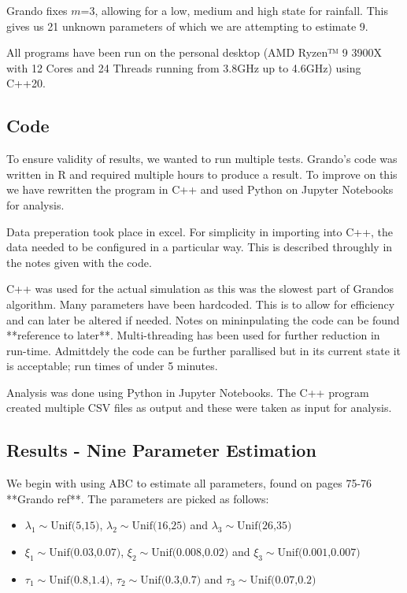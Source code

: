 Grando fixes $m$=3, allowing for a low, medium and high state for rainfall. This gives us 21 unknown parameters of which we are attempting to estimate 9.

All programs have been run on the personal desktop (AMD Ryzen™ 9 3900X with 12 Cores and 24 Threads running from 3.8GHz up to 4.6GHz) using C++20.

\subsection{Code}

To ensure validity of results, we wanted to run multiple tests. Grando's code was written in R and required multiple hours to produce a result. To improve on this we have rewritten the program in C++ and used Python on Jupyter Notebooks for analysis.

Data preperation took place in excel. For simplicity in importing into C++, the data needed to be configured in a particular way. This is described throughly in the notes given with the code. 

C++ was used for the actual simulation as this was the slowest part of Grandos algorithm. Many parameters have been hardcoded. This is to allow for efficiency and can later be altered if needed. Notes on mininpulating the code can be found **reference to later**. Multi-threading has been used for further reduction in run-time. Admittdely the code can be further parallised but in its current state it is acceptable; run times of under 5 minutes. 

Analysis was done using Python in Jupyter Notebooks. The C++ program created multiple CSV files as output and these were taken as input for analysis. 

\subsection{Results - Nine Parameter Estimation}

We begin with using ABC to estimate all parameters, found on pages 75-76 **Grando ref**. The parameters are picked as follows:

\begin{itemize}
    \item $\lambda_1 \sim \text{Unif(5,15)}$, $\lambda_2 \sim \text{Unif(16,25)}$ and $\lambda_3 \sim \text{Unif(26,35)}$
    \item $\xi_1 \sim \text{Unif(0.03,0.07)}$, $\xi_2 \sim \text{Unif(0.008,0.02)}$ and $\xi_3 \sim \text{Unif(0.001,0.007)}$
    \item $\tau_1 \sim \text{Unif(0.8,1.4)}$, $\tau_2 \sim \text{Unif(0.3,0.7)}$ and $\tau_3 \sim \text{Unif(0.07,0.2)}$
\end{itemize}

